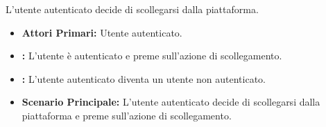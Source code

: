 L'utente autenticato decide di scollegarsi dalla piattaforma.
\begin{itemize}
    \item \textbf{Attori Primari:} Utente autenticato.
    \item \textbf{:} L'utente è autenticato e preme sull'azione di scollegamento.
    \item \textbf{:} L'utente autenticato diventa un utente non autenticato.
    \item \textbf{Scenario Principale:} L'utente autenticato decide di scollegarsi dalla piattaforma e preme sull'azione di scollegamento.
\end{itemize}
